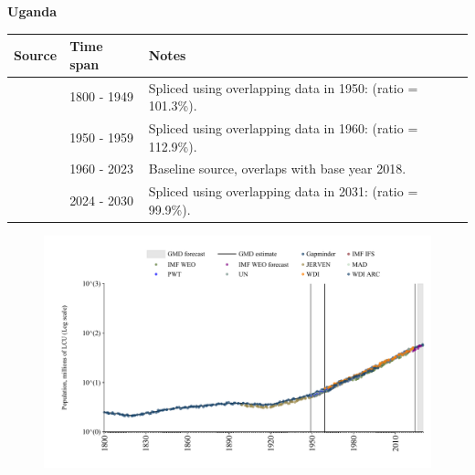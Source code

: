 \documentclass[12pt,a4paper,landscape]{article}
\begin{document}
\begin{adjustbox}{max totalsize={\paperwidth}{\paperheight},center}
\begin{minipage}[t][\textheight][t]{\textwidth}
\vspace*{0.5cm}
{}
\begin{center}
{\Large\bfseries Uganda}
\end{center}
\vspace{0.5cm}
\begin{table}[H]
\centering
\small
\begin{tabular}{|l|l|l|}
\hline
\textbf{Source} & \textbf{Time span} & \textbf{Notes} \\
\hline
\rowcolor{white}\cite{Gapminder}& 1800 - 1949 &Spliced using overlapping data in 1950: (ratio = 101.3\%).\\
\rowcolor{lightgray}\cite{IMF_IFS}& 1950 - 1959 &Spliced using overlapping data in 1960: (ratio = 112.9\%).\\
\rowcolor{white}\cite{WDI}& 1960 - 2023 &Baseline source, overlaps with base year 2018.\\
\rowcolor{lightgray}\cite{Gapminder}& 2024 - 2030 &Spliced using overlapping data in 2031: (ratio = 99.9\%).\\
\hline
\end{tabular}
\end{table}
\begin{figure}[H]
\centering
\includegraphics[width=\textwidth,height=0.6\textheight,keepaspectratio]{graphs/UGA_pop.pdf}
\end{figure}
\end{minipage}
\end{adjustbox}
\end{document}
